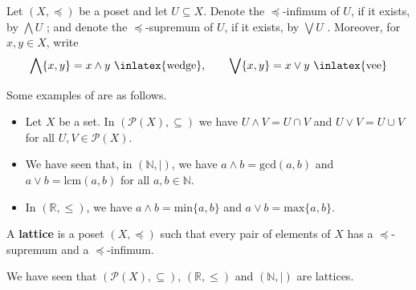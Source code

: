 \begin{notation}
\label{ntnInfSup}
Let $(X, \preceq)$ be a poset and let $U \subseteq X$. Denote the $\preceq$-infimum of $U$, if it exists, by $\bigwedge U$ ; and denote the $\preceq$-supremum of $U$, if it exists, by $\bigvee U$ . Moreover, for $x,y \in X$, write
\[ \bigwedge\{x,y\} = x \wedge y \text{ \inlatex{wedge}}, \qquad \bigvee \{ x, y \} = x \vee y \text{ \inlatex{vee}} \]
\end{notation}

\begin{example}
Some examples of  are as follows.
\begin{itemize}
\item Let $X$ be a set. In $(\mathcal{P}(X), \subseteq)$ we have $U \wedge V = U \cap V$ and $U \vee V = U \cup V$ for all $U,V \in \mathcal{P}(X)$.
\item We have seen that, in $(\mathbb{N}, {\mid})$, we have $a \wedge b = \mathrm{gcd}(a,b)$ and $a \vee b = \mathrm{lcm}(a,b)$ for all $a,b \in \mathbb{N}$.
\item In $(\mathbb{R}, \le)$, we have $a \wedge b = \mathrm{min} \{ a,b \}$ and $a \vee b = \mathrm{max} \{ a, b\}$.
\end{itemize}
\end{example}

\begin{definition}
\label{defLattice}
A \textbf{lattice} is a poset $(X, \preceq)$ such that every pair of elements of $X$ has a $\preceq$-supremum and a $\preceq$-infimum.
\end{definition}

\begin{example}
We have seen that $(\mathcal{P}(X), \subseteq)$, $(\mathbb{R}, \le)$ and $(\mathbb{N}, {\mid})$ are lattices.
\end{example}

